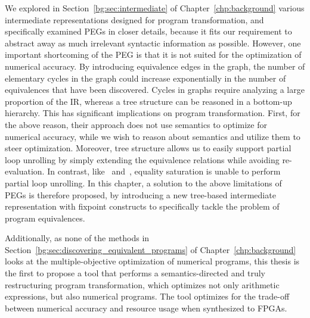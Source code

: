 We explored in Section~\ref{bg:sec:intermediate} of
Chapter~\ref{chp:background} various intermediate representations designed
for program transformation, and specifically examined PEGs in closer details,
because it fits our requirement to abstract away as much irrelevant syntactic
information as possible.  However, one important shortcoming of the PEG
is that it is not suited for the optimization of numerical accuracy.  By
introducing equivalence edges in the graph, the number of elementary cycles
in the graph could increase exponentially in the number of equivalences that
have been discovered.  Cycles in graphs require analyzing a large proportion
of the IR, whereas a tree structure can be reasoned in a bottom-up hierarchy.
This has significant implications on program transformation.  First, for the
above reason, their approach does not use semantics to optimize for numerical
accuracy, while we wish to reason about semantics and utilize them to steer
optimization.  Moreover, tree structure allows us to easily support partial
loop unrolling by simply extending the equivalence relations while avoiding
re-evaluation.  In contrast, like~\cite{martel09} and~\cite{damouche15},
equality saturation is unable to perform partial loop unrolling.  In this
chapter, a solution to the above limitations of PEGs is therefore proposed,
by introducing a new tree-based intermediate representation with fixpoint
constructs to specifically tackle the problem of program equivalences.

Additionally, as none of the methods in
Section~\ref{bg:sec:discovering_equivalent_programs} of
Chapter~\ref{chp:background} looks at the multiple-objective optimization of
numerical programs, this thesis is the first to propose a tool that performs
a semantics-directed and truly restructuring program transformation, which
optimizes not only arithmetic expressions, but also numerical programs.  The
tool optimizes for the trade-off between numerical accuracy and resource usage
when synthesized to FPGAs.


